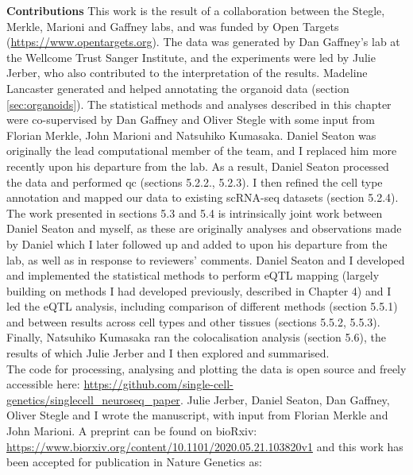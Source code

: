 \newpage

\begin{Comment2}

\hspace{-3mm}\textbf{Contributions} This work is the result of a collaboration between the Stegle, Merkle, Marioni and Gaffney labs, and was funded by Open Targets 
(\url{https://www.opentargets.org}). 
The data was generated by Dan Gaffney’s lab at the Wellcome Trust Sanger Institute, and the experiments were led by Julie Jerber, who also contributed to the interpretation of the results. 
Madeline Lancaster generated and helped annotating the organoid data (section \ref{sec:organoids}). 
The statistical methods and analyses described in this chapter were co-supervised by Dan Gaffney and Oliver Stegle with some input from Florian Merkle, John Marioni and Natsuhiko Kumasaka. 
Daniel Seaton was originally the lead computational member of the team, and I replaced him more recently upon his departure from the lab.
As a result, Daniel Seaton processed the data and performed \gls{qc} (sections 5.2.2., 5.2.3). 
I then refined the cell type annotation and mapped our data to existing scRNA-seq datasets (section 5.2.4).
The work presented in sections 5.3 and 5.4 is intrinsically joint work between Daniel Seaton and myself, as these are originally analyses and observations made by Daniel which I later followed up and added to upon his departure from the lab, as well as in response to reviewers' comments.
Daniel Seaton and I developed and implemented the statistical methods to perform eQTL mapping (largely building on methods I had developed previously, described in Chapter 4) and I led the eQTL analysis, including comparison of different methods (section 5.5.1) and between results across cell types and other tissues (sections 5.5.2, 5.5.3). 
Finally, Natsuhiko Kumasaka ran the colocalisation analysis (section 5.6), the results of which Julie Jerber and I then explored and summarised.\\

The code for processing, analysing and plotting the data is open source and freely accessible here: \url{https://github.com/single-cell-genetics/singlecell\_neuroseq\_paper}.
Julie Jerber, Daniel Seaton, Dan Gaffney, Oliver Stegle and I wrote the manuscript, with input from Florian Merkle and John Marioni.
A preprint \cite{jerber2020population} can be found on bioRxiv: \url{https://www.biorxiv.org/content/10.1101/2020.05.21.103820v1} and this work has been accepted for publication in Nature Genetics as:\\


\end{Comment2}
